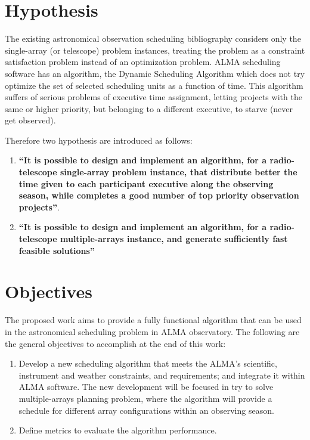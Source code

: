 \section{Hypothesis}
The existing astronomical observation scheduling bibliography considers only the single-array (or telescope) problem instances,
treating the problem as a constraint satisfaction problem instead of an optimization problem.
ALMA scheduling software has an algorithm, the Dynamic Scheduling Algorithm
which does not try optimize the set of selected scheduling units
as a function of time. This algorithm suffers of
serious problems of executive time assignment, letting projects 
with the same or higher priority, but belonging to a different executive, to starve (never get observed).

Therefore two hypothesis are introduced as follows:
\begin{enumerate}
\item \textbf{``It is possible to design and implement an algorithm, for a radio-telescope single-array problem instance, that distribute better the time given to each participant executive along the observing season, while completes a good number of top priority observation projects''}.
\item \textbf{``It is possible to design and implement an algorithm, for a radio-telescope multiple-arrays instance, and generate sufficiently fast feasible solutions''}
\end{enumerate}

\section{Objectives}
\label{sec:objectives}
The proposed work aims to provide a fully functional algorithm that can be used in the astronomical scheduling problem in ALMA observatory.
The following are the general objectives to accomplish at the end of this work:

\begin{enumerate}

\item Develop a new scheduling algorithm that meets the ALMA’s scientific, instrument and
weather constraints, and requirements; and integrate it within ALMA software.
The new development will be focused in try to solve multiple-arrays planning problem, where
the algorithm will provide a schedule for different array configurations within an
observing season.

\item Define metrics to evaluate the algorithm performance.
\end{enumerate}

